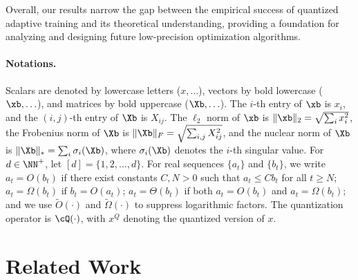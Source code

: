 \documentclass[11pt, letterpaper]{article}
\begin{document}
Overall, our results narrow the gap between the empirical success of quantized adaptive training and its theoretical understanding, providing a foundation for analyzing and designing future low-precision optimization algorithms.


\paragraph{Notations.} 
Scalars are denoted by lowercase letters ($x, \ldots$), vectors by bold lowercase ($\xb, \ldots$), and matrices by bold uppercase ($\Xb, \ldots$). 
The $i$-th entry of $\xb$ is $x_i$, and the $(i,j)$-th entry of $\Xb$ is $X_{ij}$. 
The $\ell_2$ norm of $\xb$ is $\|\xb\|_2 = \sqrt{\sum_i x_i^2}$, the Frobenius norm of $\Xb$ is $\|\Xb\|_F = \sqrt{\sum_{i,j} X_{ij}^2}$,
and the nuclear norm of $\Xb$ is $\|\Xb\|_* = \sum_i \sigma_i(\Xb)$, where $\sigma_i(\Xb)$ denotes the $i$-th singular value.
For $d \in \NN^+$, let $[d] = \{1,2,\ldots,d\}$. 
For real sequences $\{a_t\}$ and $\{b_t\}$, we write $a_t = O(b_t)$ if there exist constants $C,N>0$ such that $a_t \le Cb_t$ for all $t \ge N$; 
$a_t = \Omega(b_t)$ if $b_t = O(a_t)$; 
$a_t = \Theta(b_t)$ if both $a_t = O(b_t)$ and $a_t = \Omega(b_t)$; 
and we use $\tilde{O}(\cdot)$ and $\tilde{\Omega}(\cdot)$ to suppress logarithmic factors.
The quantization operator is $\cQ(\cdot)$, with $x^Q$ denoting the quantized version of $x$. 





\section{Related Work}\label{sec:related_work}
\end{document}
